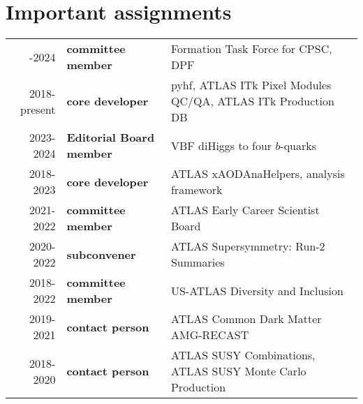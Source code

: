 \vspace{-4.5em}\section{Important assignments}\label{sec:important-assignments}
{
	\footnotesize
	\begin{tabular}{r|>{\bfseries}ll}
		\centering
		2023-2024    & committee member       & Formation Task Force for CPSC, DPF                           \\
		2018-present & core developer         & pyhf, ATLAS ITk Pixel Modules QC/QA, ATLAS ITk Production DB \\
		2023-2024    & Editorial Board member & VBF diHiggs to four $b$-quarks                               \\
		2018-2023    & core developer         & ATLAS xAODAnaHelpers, analysis framework                     \\
		2021-2022    & committee member       & ATLAS Early Career Scientist Board                           \\
		2020-2022    & subconvener            & ATLAS Supersymmetry: Run-2 Summaries                         \\
		2018-2022    & committee member       & US-ATLAS Diversity and Inclusion                             \\
		2019-2021    & contact person         & ATLAS Common Dark Matter AMG-RECAST                          \\
		2018-2020    & contact person         & ATLAS SUSY Combinations, ATLAS SUSY Monte Carlo Production   \\
	\end{tabular}
}

